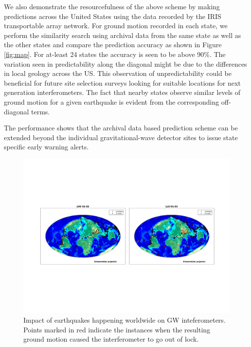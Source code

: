 \documentclass[preprint, aps, showpacs]{revtex4-1}
\begin{document}
We also demonstrate the resourcefulness  of the above scheme by making predictions across the United States using the data recorded by the IRIS transportable array network. For ground motion recorded in each state, we perform the similarity search using archival data from the same state as well as the other states and compare the prediction accuracy as shown in Figure \ref{fig:map}.  For at-least 24 states the accuracy is seen to be above 90\%. The variation seen in predictability along the diagonal might be due to the differences in local geology across the US. This observation of unpredictability could be beneficial for future site selection surveys looking for suitable locations for next generation interferometers. The fact that nearby states observe similar levels of ground motion for a given earthquake is evident from the corresponding off-diagonal terms.  

The performance shows that the archival data based prediction scheme can be extended beyond the individual gravitational-wave detector sites to issue state specific early warning alerts.

\begin{figure}[!htb]
\hspace*{-0.5cm}
 \includegraphics[width=\textwidth]{./plots/EQ_Distribution.pdf}
 \caption{Impact of earthquakes happening worldwide on GW inteferometers. Points marked in red indicate the instances when the resulting ground motion caused the interferometer to go out of lock.}
 \label{fig:lockloss_distribution}
\end{figure}
\end{document}
